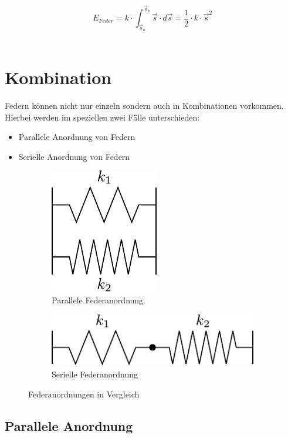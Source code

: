 \[ \boxed{E_{Feder} 
	= k \cdot \int_{\vec{s}_a}^{\vec{s}_b} \vec{s} \cdot d\vec{s} 
	= \frac{1}{2} \cdot k \cdot \vec{s}^2
} \] \\

\section{Kombination}
Federn können nicht nur einzeln sondern auch in Kombinationen vorkommen. 
Hierbei werden im speziellen zwei Fälle unterschieden:

\begin{itemize}
	\item Parallele Anordnung von Federn
	\item Serielle Anordnung von Federn
\end{itemize}

\begin{figure}[h!]
	\centering
	\begin{subfigure}[c]{0.45\textwidth}
		\includegraphics[scale=0.75]{feder-parallel.pdf}
		\caption{Parallele Federanordnung.}
		\label{fig:feder-parallel}
	\end{subfigure}
	\begin{subfigure}[c]{0.45\textwidth}
		\includegraphics[scale=0.75]{feder-seriell.pdf}
		\caption{Serielle Federanordnung}
		\label{fig:feder-seriell}
	\end{subfigure}
	\caption{Federanordnungen in Vergleich}
	\label{fig:federanordnungen}
\end{figure}

\subsection{Parallele Anordnung}

